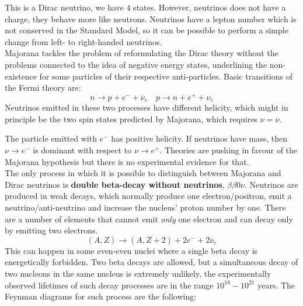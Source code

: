 \documentclass[10.75pt,a4paper,openright,bottom=2cm]{article}
\begin{document}
This is a Dirac neutrino, we have 4 states. However, neutrinos does not have a charge, they behave more like neutrons. Neutrinos have a lepton number which is not conserved in the Standard Model, so it can be possible to perform a simple change from left- to right-handed neutrinos.\\
Majorana tackles the problem of reformulating the Dirac theory without the problems connected to the idea of negative energy states, underlining the non-existence for some particles of their respective anti-particles. Basic transitions of the Fermi theory are:
\[
n\to p+e^-+\overline{\nu}_e \quad p\to n+e^++\nu_e
\]
Neutrinos emitted in these two processes have different helicity, which might in principle be the two spin states predicted by Majorana, which requires $\nu=\overline{\nu}$.
\begin{center}
\end{center}
The particle emitted with $e^-$ has positive helicity. If neutrinos have mass, then $\nu\to e^-$ is dominant with respect to $\nu\to e^+$. Theories are pushing in favour of the Majorana hypothesis but there is no experimental evidence for that.\\
The only process in which it is possible to distinguish between Majorana and Dirac neutrinos is \textbf{double beta-decay without neutrinos}, $\beta\beta0\nu$. Neutrinos are produced in weak decays, which normally produce one electron/positron, emit a neutrino/anti-neutrino and increase the nucleus' proton number by one. There are a number of elements that cannot emit \textit{only} one electron and can decay only by emitting two electrons.
\[
(A,Z)\to(A,Z+2)+2e^-+2\overline{\nu}_e
\]
This can happen in some even-even nuclei where a single beta decay is energetically forbidden. Two beta decays are allowed, but a simultaneous decay of two nucleons in the same nucleus is extremely unlikely, the experimentally observed lifetimes of such decay processes are in the range $10^{18}-10^{21}$ years. The Feynman diagrams for such process are the following:
\end{document}
